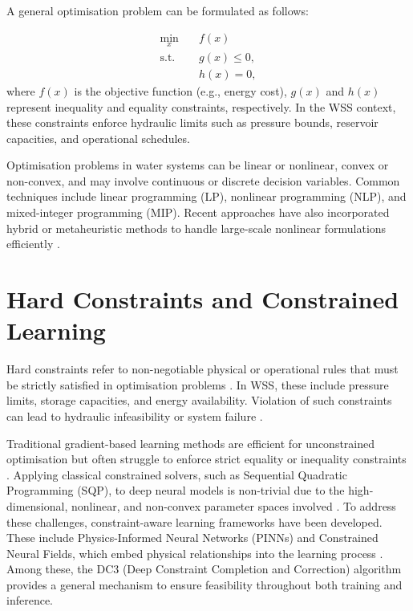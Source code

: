 A general optimisation problem can be formulated as follows:

\begin{equation}
\begin{aligned}
\min_{x} \quad & f(x) \\
\text{s.t.} \quad & g(x) \le 0, \\
& h(x) = 0,
\end{aligned}
\end{equation}
where $f(x)$ is the objective function (e.g., energy cost), $g(x)$ and $h(x)$ represent inequality and equality constraints, respectively. In the WSS context, these constraints enforce hydraulic limits such as pressure bounds, reservoir capacities, and operational schedules.

Optimisation problems in water systems can be linear or nonlinear, convex or non-convex, and may involve continuous or discrete decision variables. Common techniques include linear programming (LP), nonlinear programming (NLP), and mixed-integer programming (MIP). Recent approaches have also incorporated hybrid or metaheuristic methods to handle large-scale nonlinear formulations efficiently \cite{rfc29}.

\section{Hard Constraints and Constrained Learning}

Hard constraints refer to non-negotiable physical or operational rules that must be strictly satisfied in optimisation problems \cite{rfc16}. In WSS, these include pressure limits, storage capacities, and energy availability. Violation of such constraints can lead to hydraulic infeasibility or system failure \cite{rfc17}.

Traditional gradient-based learning methods are efficient for unconstrained optimisation but often struggle to enforce strict equality or inequality constraints \cite{rfc10}. Applying classical constrained solvers, such as Sequential Quadratic Programming (SQP), to deep neural models is non-trivial due to the high-dimensional, nonlinear, and non-convex parameter spaces involved \cite{rfc18}.
To address these challenges, constraint-aware learning frameworks have been developed. These include Physics-Informed Neural Networks (PINNs) and Constrained Neural Fields, which embed physical relationships into the learning process \cite{rfc15, rfc10, rfc16}. Among these, the DC3 (Deep Constraint Completion and Correction) algorithm provides a general mechanism to ensure feasibility throughout both training and inference.

